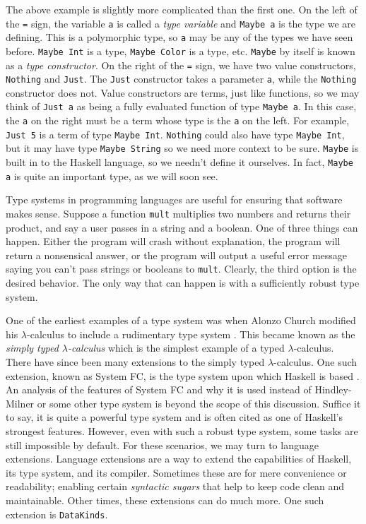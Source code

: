 \documentclass[MS, xcolor=dvipsnames]{wfuthesis}
\theoremstyle{definition}
\begin{document}
The above example is slightly more complicated than the first one. On the left of the \lstinline{=} sign, the variable \lstinline{a} is called a \emph{type variable} and \lstinline{Maybe a} is the type we are defining. This is a polymorphic type, so \lstinline{a} may be any of the types we have seen before. \lstinline{Maybe Int} is a type, \lstinline{Maybe Color} is a type, etc. \lstinline{Maybe} by itself is known as a \emph{type constructor}. On the right of the \lstinline{=} sign, we have two value constructors, \lstinline{Nothing} and \lstinline{Just}. The \lstinline{Just} constructor takes a parameter \lstinline{a}, while the \lstinline{Nothing} constructor does not. Value constructors are terms, just like functions, so we may think of \lstinline{Just a} as being a fully evaluated function of type \lstinline{Maybe a}. In this case, the \lstinline{a} on the right must be a term whose type is the \lstinline{a} on the left. For example, \lstinline{Just 5} is a term of type \lstinline{Maybe Int}. \lstinline{Nothing} could also have type \lstinline{Maybe Int}, but it may have type \lstinline{Maybe String} so we need more context to be sure. \lstinline{Maybe} is built in to the Haskell language, so we needn't define it ourselves. In fact, \lstinline{Maybe a} is quite an important type, as we will soon see. \par
Type systems in programming languages are useful for ensuring that software makes sense. Suppose a function \lstinline{mult} multiplies two numbers and returns their product, and say a user passes in a string and a boolean. One of three things can happen. Either the program will crash without explanation, the program will return a nonsensical answer, or the program will output a useful error message saying you can't pass strings or booleans to \lstinline{mult}. Clearly, the third option is the desired behavior. The only way that can happen is with a sufficiently robust type system. \par
One of the earliest examples of a type system was when Alonzo Church modified his $\lambda$-calculus to include a rudimentary type system \cite{Church1940}. This became known as the \emph{simply typed $\lambda$-calculus} which is the simplest example of a typed $\lambda$-calculus. There have since been many extensions to the simply typed $\lambda$-calculus. One such extension, known as System FC, is the type system upon which Haskell is based \cite{Eisenberg2013}. An analysis of the features of System FC and why it is used instead of Hindley-Milner or some other type system is beyond the scope of this discussion. Suffice it to say, it is quite a powerful type system and is often cited as one of Haskell's strongest features. However, even with such a robust type system, some tasks are still impossible by default. For these scenarios, we may turn to language extensions. Language extensions are a way to extend the capabilities of Haskell, its type system, and its compiler. Sometimes these are for mere convenience or readability; enabling certain \emph{syntactic sugars} that help to keep code clean and maintainable. Other times, these extensions can do much more. One such extension is \lstinline{DataKinds}. \par
\end{document}
